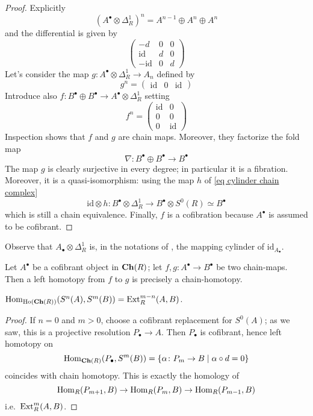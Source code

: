 \begin{refsection}
\begin{proof}
Explicitly
\[
(A^\bullet \otimes \Delta^1_R)^n = A^{n-1} \oplus A^n \oplus A^n
\]
and the differential is given by
\[
\begin{pmatrix}
- d & 0 & 0 \\ \mathrm{id} & d & 0 \\ - \mathrm{id} & 0 & d
\end{pmatrix}
\]
Let's consider the map $g \colon A^\bullet \otimes \Delta^1_R \to A_n$ defined by
\[
g^n = \begin{pmatrix} \mathrm{id} & 0 & \mathrm{id} \end{pmatrix}
\]
Introduce also $f \colon B^\bullet \oplus B^\bullet \to A^\bullet \otimes \Delta^1_R$ setting
\[
f^n = \begin{pmatrix} \mathrm{id} & 0 \\ 0 & 0 \\ 0 & \mathrm{id} \end{pmatrix}
\]
Inspection shows that $f$ and $g$ are chain maps. Moreover, they factorize the fold map
\[
\nabla \colon B^\bullet \oplus B^\bullet \to B^\bullet
\]
The map $g$ is clearly surjective in every degree; in particular it is a fibration. Moreover, it is a quasi-isomorphism: using the map $h$ of \eqref{eq cylinder chain complex}
\[
\mathrm{id} \otimes h \colon B^\bullet \otimes \Delta^1_R \to B^\bullet \otimes S^0(R) \simeq B^\bullet
\]
which is still a chain equivalence. Finally, $f$ is a cofibration because $A^\bullet$ is assumed to be cofibrant.
\end{proof}

\begin{rmk}
Observe that $A_\bullet \otimes \Delta^1_R$ is, in the notations of \cite[Section 1.5]{weibel}, the mapping cylinder of $\mathrm{id}_{A_\bullet}$.
\end{rmk}

\begin{cor}
Let $A^\bullet$ be a cofibrant object in $\mathbf{Ch}(R)$; let $f, g \colon A^\bullet \to B^\bullet$ be two chain-maps. Then a left homotopy from $f$ to $g$ is precisely a chain-homotopy.
\end{cor}

\begin{prop}
$\mathrm{Hom}_{\mathrm{Ho}(\mathbf{Ch}(R))}(S^n(A),S^m(B)) = \mathrm{Ext}_R^{m-n}(A,B)$.
\end{prop}

\begin{proof}
If $n = 0$ and $m > 0$, choose a cofibrant replacement for $S^0(A)$; as we saw, this is a projective resolution $P_\bullet \to A$. Then $P_\bullet$ is cofibrant, hence left homotopy on
\[
\mathrm{Hom}_{\mathbf{Ch}(R)}(P_\bullet, S^m(B)) = \{\alpha \colon P_m \to B \mid \alpha \circ d = 0 \}
\]
coincides with chain homotopy. This is exactly the homology of
\[
\mathrm{Hom}_R(P_{m+1},B) \to \mathrm{Hom}_R(P_m,B) \to \mathrm{Hom}_R(P_{m-1},B)
\]
i.e.\ $\mathrm{Ext}^m_R(A,B)$.
\end{proof}


\end{refsection}
